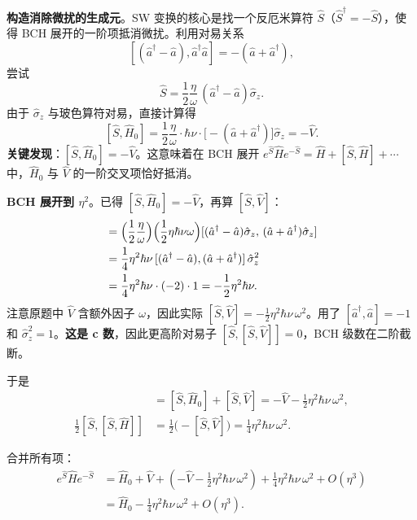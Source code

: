 \textbf{构造消除微扰的生成元}。SW 变换的核心是找一个反厄米算符 $\hat{S}$（$\hat{S}^\dagger=-\hat{S}$），使得 BCH 展开的一阶项抵消微扰。利用对易关系
\[
[(\hat{a}^\dagger-\hat{a}),\hat{a}^\dagger\hat{a}] = -(\hat{a}+\hat{a}^\dagger),
\]
尝试
\[
\hat{S} = \frac12\frac{\eta}{\omega}\,(\hat{a}^\dagger-\hat{a})\hat{\sigma}_z.
\]
由于 $\hat{\sigma}_z$ 与玻色算符对易，直接计算得
\begin{equation}
\label{eq:sw-sh0}
[\hat{S},\hat{H}_0] = \frac12\frac{\eta}{\omega}\cdot\hbar\nu\cdot\bigl[-(\hat{a}+\hat{a}^\dagger)\bigr]\hat{\sigma}_z = -\hat{V}.
\end{equation}
\textbf{关键发现}：$[\hat{S},\hat{H}_0]=-\hat{V}$。这意味着在 BCH 展开 $e^{\hat{S}}\hat{H}e^{-\hat{S}} = \hat{H} + [\hat{S},\hat{H}] + \cdots$ 中，$\hat{H}_0$ 与 $\hat{V}$ 的一阶交叉项恰好抵消。

\textbf{BCH 展开到 $\eta^2$}。已得 $[\hat{S},\hat{H}_0]=-\hat{V}$，再算 $[\hat{S},\hat{V}]$：
\begin{align*}
[\hat{S},\hat{V}]
&= \Bigl(\frac12\frac{\eta}{\omega}\Bigr)\Bigl(\frac12\eta\hbar\nu\omega\Bigr)
[(\hat{a}^\dagger-\hat{a})\hat{\sigma}_z,\,(\hat{a}+\hat{a}^\dagger)\hat{\sigma}_z] \\
&= \frac14\eta^2\hbar\nu\,[(\hat{a}^\dagger-\hat{a}),(\hat{a}+\hat{a}^\dagger)]\,\hat{\sigma}_z^2 \\
&= \frac14\eta^2\hbar\nu\cdot(-2)\cdot 1 = -\frac12\eta^2\hbar\nu.
\end{align*}
注意原题中 $\hat{V}$ 含额外因子 $\omega$，因此实际 $[\hat{S},\hat{V}] = -\frac12\eta^2\hbar\nu\,\omega^2$。用了 $[\hat{a}^\dagger,\hat{a}]=-1$ 和 $\hat{\sigma}_z^2=1$。\textbf{这是 c 数}，因此更高阶对易子 $[\hat{S},[\hat{S},\hat{V}]]=0$，BCH 级数在二阶截断。

于是
\begin{align*}
[\hat{S},\hat{H}] &= [\hat{S},\hat{H}_0] + [\hat{S},\hat{V}] = -\hat{V} - \frac12\eta^2\hbar\nu\,\omega^2, \\
\frac12[\hat{S},[\hat{S},\hat{H}]] &= \frac12\bigl(-[\hat{S},\hat{V}]\bigr) = \frac14\eta^2\hbar\nu\,\omega^2.
\end{align*}

合并所有项：
\begin{align*}
e^{\hat{S}}\hat{H}e^{-\hat{S}}
&= \hat{H}_0 + \hat{V} + (-\hat{V} - \tfrac12\eta^2\hbar\nu\,\omega^2) + \tfrac14\eta^2\hbar\nu\,\omega^2 + O(\eta^3) \\
&= \hat{H}_0 - \frac14\eta^2\hbar\nu\,\omega^2 + O(\eta^3).
\end{align*}

